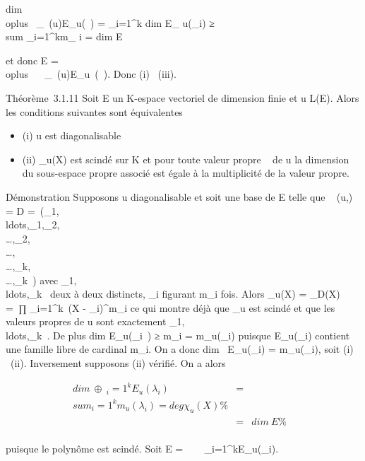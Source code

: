 \documentclass[]{article}
\begin{document}
dim~ \\oplus~
_\lambda~\in{}(u)E_u(\lambda~) =
\sum _i=1^k dim E_
u(\lambda_i) ≥\\sum
_i=1^km_ i = dim E

et donc E = \\oplus~ ~
_\lambda~\in{}(u)E_u~(\lambda~).
Donc (i) \rigtharrow~(iii).

Théorème~3.1.11 Soit E un K-espace vectoriel de dimension finie et u \in
L(E). Alors les conditions suivantes sont équivalentes

\begin{itemize}
\itemsep1pt\parskip0pt
\item
  (i) u est diagonalisable
\item
  (ii) \chi_u(X) est scindé sur K et pour toute valeur propre \lambda~ de
  u la dimension du sous-espace propre associé est égale à la
  multiplicité de la valeur propre.
\end{itemize}

Démonstration Supposons u diagonalisable et soit  une base de E telle
que \mathrmMat~ (u,) = D
=\
\mathrmdiag(\lambda_1,\\ldots,\lambda_1,\lambda_2,\\\ldots,\lambda_2,\\\ldots,\\\ldots,\lambda_k,\\\ldots,\lambda_k~)
avec
\lambda_1,\\ldots,\lambda_k~
deux à deux distincts, \lambda_i figurant m_i fois. Alors
\chi_u(X) = \chi_D(X) =\
∏  _i=1^k~(X -
\lambda_i)^m_i ce qui montre déjà que \chi_u
est scindé et que les valeurs propres de u sont exactement
\lambda_1,\\ldots,\lambda_k~.
De plus dim E_u(\lambda_i~) ≥
m_i = m_u(\lambda_i) puisque
E_u(\lambda_i) contient une famille libre de cardinal
m_i. On a donc dim~
E_u(\lambda_i) = m_u(\lambda_i), soit (i) \rigtharrow~(ii).
Inversement supposons (ii) vérifié. On a alors

\begin{align*} dim~
\oplus~ _i=1^kE_
u(\lambda_i)& =& \\sum
_i=1^km_ u(\lambda_i) = deg
\chi_u(X)\%& \\ & =&
dim~ E \%& \\
\end{align*}

puisque le polynôme est scindé. Soit E =\
\oplus~ ~
_i=1^kE_u(\lambda_i).
\end{document}
